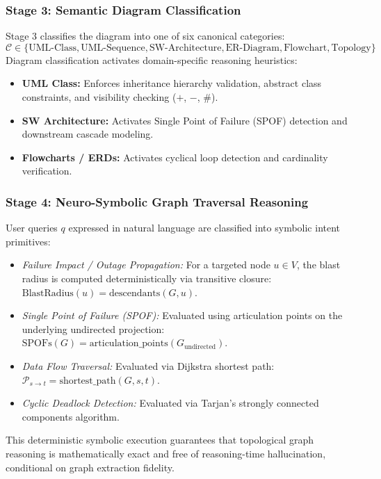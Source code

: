 \documentclass[runningheads]{llncs}
\begin{document}
\subsubsection{Stage 3: Semantic Diagram Classification}
Stage 3 classifies the diagram into one of six canonical categories:
\begin{equation}
    \mathcal{C} \in \{\text{UML-Class}, \text{UML-Sequence}, \text{SW-Architecture}, \text{ER-Diagram}, \text{Flowchart}, \text{Topology}\}
\end{equation}
Diagram classification activates domain-specific reasoning heuristics:
\begin{itemize}
    \item \textbf{UML Class:} Enforces inheritance hierarchy validation, abstract class constraints, and visibility checking ($+$, $-$, $\#$).
    \item \textbf{SW Architecture:} Activates Single Point of Failure (SPOF) detection and downstream cascade modeling.
    \item \textbf{Flowcharts / ERDs:} Activates cyclical loop detection and cardinality verification.
\end{itemize}

\subsubsection{Stage 4: Neuro-Symbolic Graph Traversal Reasoning}
User queries $q$ expressed in natural language are classified into symbolic intent primitives:
\begin{itemize}
    \item \textit{Failure Impact / Outage Propagation:} For a targeted node $u \in V$, the blast radius is computed deterministically via transitive closure: $\text{BlastRadius}(u) = \text{descendants}(G, u)$.
    \item \textit{Single Point of Failure (SPOF):} Evaluated using articulation points on the underlying undirected projection: $\text{SPOFs}(G) = \text{articulation\_points}(G_{\text{undirected}})$.
    \item \textit{Data Flow Traversal:} Evaluated via Dijkstra shortest path: $\mathcal{P}_{s \rightarrow t} = \text{shortest\_path}(G, s, t)$.
    \item \textit{Cyclic Deadlock Detection:} Evaluated via Tarjan's strongly connected components algorithm.
\end{itemize}
This deterministic symbolic execution guarantees that topological graph reasoning is mathematically exact and free of reasoning-time hallucination, conditional on graph extraction fidelity.
\end{document}

